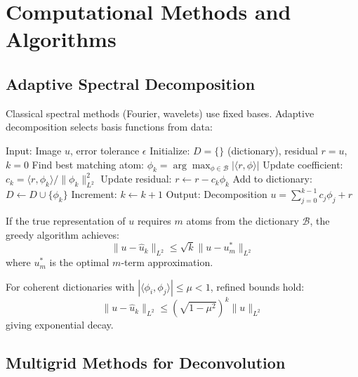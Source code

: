 \documentclass[twocolumn,11pt]{article}
\begin{document}
\section{Computational Methods and Algorithms}

\subsection{Adaptive Spectral Decomposition}

Classical spectral methods (Fourier, wavelets) use fixed bases. Adaptive decomposition selects basis functions from data:

\begin{algorithm}
\caption{Adaptive Spectral Decomposition with Greedy Selection}
\begin{algorithmic}[1]
\State Input: Image $u$, error tolerance $\epsilon$
\State Initialize: $D = \{\}$ (dictionary), residual $r = u$, $k = 0$
  \State Find best matching atom: $\phi_k = \arg\max_{\phi \in \mathcal{B}} |\langle r, \phi \rangle|$
  \State Update coefficient: $c_k = \langle r, \phi_k \rangle / \|\phi_k\|_{L^2}^2$
  \State Update residual: $r \leftarrow r - c_k \phi_k$
  \State Add to dictionary: $D \leftarrow D \cup \{\phi_k\}$
  \State Increment: $k \leftarrow k + 1$
\EndWhile
\State Output: Decomposition $u = \sum_{j=0}^{k-1} c_j \phi_j + r$
\end{algorithmic}
\end{algorithm}

\begin{theorem}
If the true representation of $u$ requires $m$ atoms from the dictionary $\mathcal{B}$, the greedy algorithm achieves:
\begin{equation}
\|u - \hat{u}_k\|_{L^2} \leq \sqrt{k} \|u - u_m^*\|_{L^2}
\end{equation}
where $u_m^*$ is the optimal $m$-term approximation.

For coherent dictionaries with $|\langle \phi_i, \phi_j \rangle| \leq \mu < 1$, refined bounds hold:
\begin{equation}
\|u - \hat{u}_k\|_{L^2} \leq \left(\sqrt{1-\mu^2}\right)^k \|u\|_{L^2}
\end{equation}
giving exponential decay.
\end{theorem}

\subsection{Multigrid Methods for Deconvolution}
\end{document}
